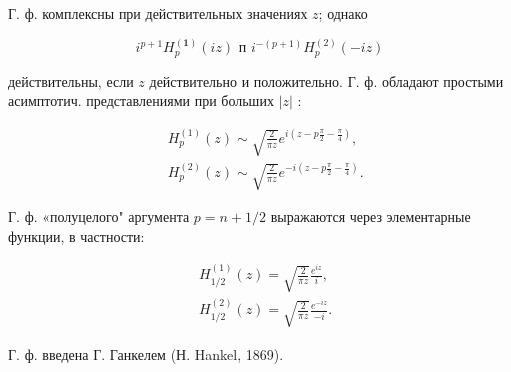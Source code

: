 \documentclass[10pt]{article}
\begin{document}
Г. ф. комплексны при действительных значениях $z$; однако



\[

i^{p+1} H_{p}^{(\mathbf{1})}(i z) \text { п } i^{-(p+1)} H_{p}^{(2)}(-i z)

\]



действительны, если $z$ действительно и положительно. Г. ф. обладают простыми асимптотич. представлениями при больших $|z|$ :



\[

\begin{aligned}

& H_{p}^{(1)}(z) \sim \sqrt{\frac{2}{\pi z}} e^{i\left(z-p \frac{\pi}{2}-\frac{\pi}{4}\right)}, \\

& H_{p}^{(2)}(z) \sim \sqrt{\frac{2}{\pi z}} e^{-i\left(z-p \frac{\pi}{2}-\frac{\pi}{4}\right)} .

\end{aligned}

\]



Г. ф. «полуцелого" аргумента $p=n+1 / 2$ выражаются через элементарные функции, в частности:



\[

\begin{aligned}

& H_{1 / 2}^{(1)}(z)=\sqrt{\frac{2}{\pi z}} \frac{e^{i z}}{i}, \\

& H_{1 / 2}^{(2)}(z)=\sqrt{\frac{2}{\pi z}} \frac{e^{-i z}}{-i} .

\end{aligned}

\]



Г. ф. введена Г. Ганкелем (Н. Hankel, 1869).
\end{document}
